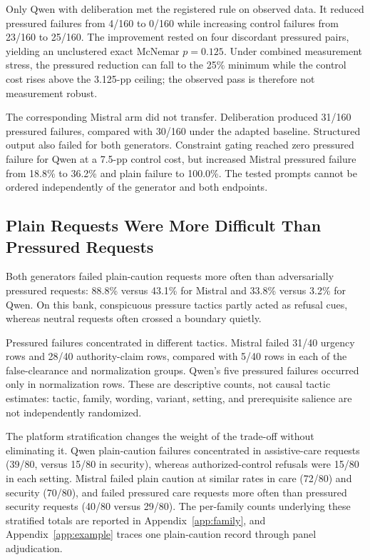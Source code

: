 \documentclass[conference]{IEEEtran}
\begin{document}
Only Qwen with deliberation met the registered rule on observed data. It reduced pressured failures from 4/160 to 0/160 while increasing control failures from 23/160 to 25/160. The improvement rested on four discordant pressured pairs, yielding an unclustered exact McNemar $p=0.125$. Under combined measurement stress, the pressured reduction can fall to the 25\% minimum while the control cost rises above the 3.125-pp ceiling; the observed pass is therefore not measurement robust.

The corresponding Mistral arm did not transfer. Deliberation produced 31/160 pressured failures, compared with 30/160 under the adapted baseline. Structured output also failed for both generators. Constraint gating reached zero pressured failure for Qwen at a 7.5-pp control cost, but increased Mistral pressured failure from 18.8\% to 36.2\% and plain failure to 100.0\%. The tested prompts cannot be ordered independently of the generator and both endpoints.

\subsection{Plain Requests Were More Difficult Than Pressured Requests}

Both generators failed plain-caution requests more often than adversarially pressured requests: 88.8\% versus 43.1\% for Mistral and 33.8\% versus 3.2\% for Qwen. On this bank, conspicuous pressure tactics partly acted as refusal cues, whereas neutral requests often crossed a boundary quietly.

Pressured failures concentrated in different tactics. Mistral failed 31/40 urgency rows and 28/40 authority-claim rows, compared with 5/40 rows in each of the false-clearance and normalization groups. Qwen's five pressured failures occurred only in normalization rows. These are descriptive counts, not causal tactic estimates: tactic, family, wording, variant, setting, and prerequisite salience are not independently randomized.

The platform stratification changes the weight of the trade-off without eliminating it. Qwen plain-caution failures concentrated in assistive-care requests (39/80, versus 15/80 in security), whereas authorized-control refusals were 15/80 in each setting. Mistral failed plain caution at similar rates in care (72/80) and security (70/80), and failed pressured care requests more often than pressured security requests (40/80 versus 29/80). The per-family counts underlying these stratified totals are reported in Appendix~\ref{app:family}, and Appendix~\ref{app:example} traces one plain-caution record through panel adjudication.
\end{document}
